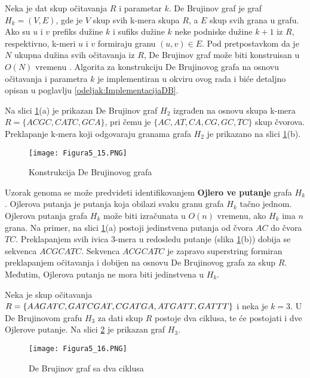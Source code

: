 \documentclass[12pt,oneside]{memoir}
\begin{document}
Neka je dat skup očitavanja $R$ i parametar $k$. De Brujinov graf je graf $H_k = (V, E)$, gde je $V$ skup svih k-mera skupa $R$, a $E$ skup svih grana u grafu. Ako su $u$ i $v$ prefiks dužine $k$ i sufiks dužine $k$ neke podniske dužine $k + 1$ iz $R$, respektivno, k-meri $u$ i $v$ formiraju granu $(u, v) \in E$. Pod pretpostavkom da je $N$ ukupna dužina svih očitavanja iz $R$, De Brujinov graf može biti konstruisan u $O(N)$ vremenu \cite{WingKinSung}. Algorita za konstrukciju De Brujinovog grafa na osnovu očitavanja i parametra $k$ je implementiran u okviru ovog rada i biće detaljno opisan u poglavlju \ref{odeljak:ImplementacijaDB}.

Na slici \ref{fig:9}(a) je prikazan De Brujinov graf $H_2$ izgrađen na osnovu skupa k-mera $R = \{ACGC, CATC, GCA\}$, pri čemu je $\{AC, AT, CA, CG, GC, TC\}$ skup čvorova. Preklapanje k-mera koji odgovaraju granama grafa $H_2$ je prikazano na slici \ref{fig:9}(b).

\begin{figure}[!ht]
\centering
\texttt{[image: Figura5\_15.PNG]}
\caption{Konstrukcija De Brujinovog grafa \cite{WingKinSung}}
 \label{fig:9}
 \end{figure}

Uzorak genoma se može predvideti identifikovanjem \textbf{Ojlero           ve putanje} grafa $H_k$. Ojlerova putanja je putanja koja obilazi svaku granu grafa $H_k$ tačno jednom. Ojlerova putanja grafa $H_k$ može biti izračunata u $O(n)$ vremenu, ako $H_k$ ima $n$ grana. Na primer, na slici \ref{fig:9}(a) postoji jedinstvena putanja od čvora $AC$ do čvora $TC$. Preklapanjem svih ivica 3-mera u redosledu putanje (slika \ref{fig:9}(b)) dobija se sekvenca $ACGCATC$. Sekvenca $ACGCATC$ je zapravo superstring formiran preklapanjem očitavanja i dobijen na osnovu De Brujinovog grafa za skup $R$. Međutim, Ojlerova putanja ne mora biti jedinstvena u $H_k$.

Neka je skup očitavanja $R = \{AAGATC, GATCGAT, CGATGA, ATGATT,\\ GATTT\}$ i neka je $k = 3$. U De Brujinovom grafu $H_3$ za dati skup $R$ postoje dva ciklusa, te će postojati i dve Ojlerove putanje. Na slici \ref{fig:10} je prikazan graf $H_3$.

\begin{figure}[!ht]
\centering
\texttt{[image: Figura5\_16.PNG]}
\caption{De Brujinov graf sa dva ciklusa \cite{WingKinSung}}
\label{fig:10}
\end{figure}
\end{document}

